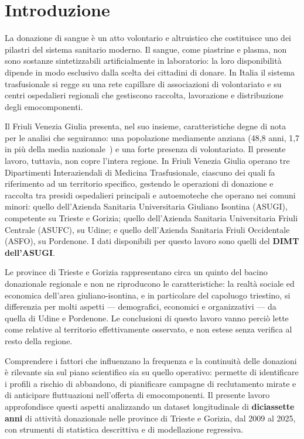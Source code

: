\chapter{Introduzione}

La donazione di sangue è un atto volontario e altruistico che costituisce uno
dei pilastri del sistema sanitario moderno. Il sangue, come piastrine e plasma,
non sono sostanze sintetizzabili artificialmente in laboratorio: 
la loro disponibilità dipende in modo esclusivo dalla scelta dei cittadini di donare.
In Italia il sistema trasfusionale si regge su una rete capillare di associazioni di 
volontariato e su centri ospedalieri regionali che gestiscono raccolta, lavorazione e
distribuzione degli emocomponenti.

Il Friuli Venezia Giulia presenta, nel suo insieme, caratteristiche degne di
nota per le analisi che seguiranno: una popolazione mediamente anziana (48,8 anni,
1,7 in più della media nazionale~\cite{etàmediaFVG}) e una forte presenza di
volontariato. Il presente lavoro, tuttavia, non copre l'intera regione. In Friuli Venezia
Giulia operano tre Dipartimenti Interaziendali di Medicina Trasfusionale,
ciascuno dei quali fa riferimento ad un territorio specifico, gestendo
le operazioni di donazione e raccolta tra presidi ospedalieri principali e 
autoemoteche che operano nei comuni minori:
quello dell'Azienda Sanitaria Universitaria Giuliano Isontina (ASUGI), 
competente su Trieste e Gorizia; quello
dell'Azienda Sanitaria Universitaria Friuli Centrale (ASUFC), su Udine; e
quello dell'Azienda Sanitaria Friuli Occidentale (ASFO), su Pordenone. I dati
disponibili per questo lavoro sono quelli del \textbf{DIMT dell'ASUGI}.

Le province di Trieste e Gorizia rappresentano circa un quinto del bacino
donazionale regionale e non ne riproducono le caratteristiche: la realtà
sociale ed economica dell'area giuliano-isontina, e in particolare del
capoluogo triestino, si differenzia per molti aspetti --- demografici,
economici e organizzativi --- da quella di Udine e Pordenone. Le conclusioni
di questo lavoro vanno perciò lette come relative al territorio
effettivamente osservato, e non estese senza verifica al resto della regione.

Comprendere i fattori che influenzano la frequenza e la continuità delle
donazioni è rilevante sia sul piano scientifico sia su quello operativo:
permette di identificare i profili a rischio di abbandono, di pianificare
campagne di reclutamento mirate e di anticipare fluttuazioni nell'offerta di
emocomponenti. Il presente lavoro approfondisce questi aspetti analizzando un
dataset longitudinale di \textbf{diciassette anni} di attività donazionale
nelle province di Trieste e Gorizia, dal 2009 al 2025, con strumenti di
statistica descrittiva e di modellazione regressiva.

